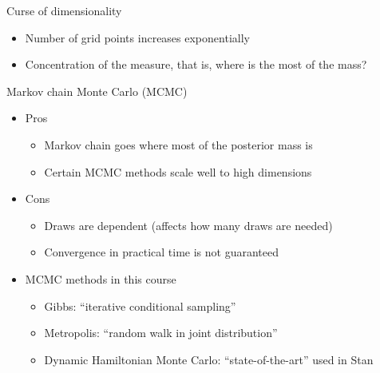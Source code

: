 \documentclass[english,t]{beamer}
\begin{document}
\begin{frame}{Curse of dimensionality}

  \begin{itemize}
  \item Number of grid points increases exponentially
  \item Concentration of the measure, that is, where is the most of the
    mass?
  \end{itemize}

\end{frame}

\begin{frame}{Markov chain Monte Carlo (MCMC)}

  \begin{itemize}
  \item Pros
    \begin{itemize}
    \item Markov chain goes where most of the posterior mass is
    \item Certain MCMC methods scale well to high dimensions
    \end{itemize}
  \item Cons
    \begin{itemize}
    \item Draws are dependent (affects how many draws are needed)
    \item Convergence in practical time is not guaranteed
    \end{itemize}
  \item MCMC methods in this course
    \begin{itemize}
    \item Gibbs: ``iterative conditional sampling''
    \item Metropolis: ``random walk in joint distribution''
    \item Dynamic Hamiltonian Monte Carlo: ``state-of-the-art'' used in Stan
    \end{itemize}
  \end{itemize}

\end{frame}
\end{document}
